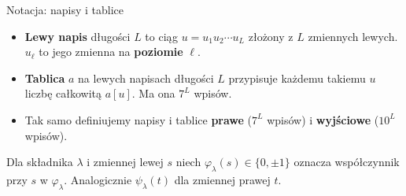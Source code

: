 \begin{frame}{Notacja: napisy i tablice}
  \small
  \begin{definicja}
    \begin{itemize}
      \item \textbf{Lewy napis} długości $L$ to ciąg $u=u_1u_2\cdots u_L$ złożony z $L$ zmiennych lewych.
        $u_\ell$ to jego zmienna na \textbf{poziomie} $\ell$.
      \item \textbf{Tablica} $a$ na lewych napisach długości $L$ przypisuje każdemu takiemu $u$ liczbę
        całkowitą $a[u]$. Ma ona $7^L$ wpisów.
      \item Tak samo definiujemy napisy i tablice \textbf{prawe} ($7^L$ wpisów) i \textbf{wyjściowe} ($10^L$ wpisów).
    \end{itemize}
  \end{definicja}
  \pause
  \begin{definicja}
    Dla składnika $\lambda$ i zmiennej lewej $s$ niech $\varphi_\lambda(s)\in\{0,\pm1\}$ oznacza współczynnik
    przy $s$ w $\varphi_\lambda$. Analogicznie $\psi_\lambda(t)$ dla zmiennej prawej $t$.
  \end{definicja}
\end{frame}

